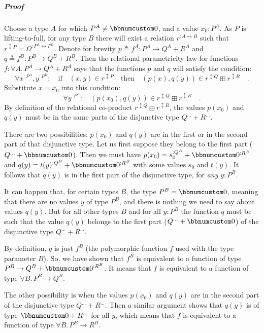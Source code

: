 \subparagraph{Proof}

Choose a type $A$ for which $P^{A}\neq\bbnum 0$, and a value $x_{0}:P^{A}$.
As $P$ is lifting-to-full, for any type $B$ there will exist a relation
$r^{:A\leftrightarrow B}$ such that $r^{\updownarrow P}=\Omega^{:P^{A}\leftrightarrow P^{B}}$.
Denote for brevity $p\triangleq f^{A}:P^{A}\rightarrow Q^{A}+R^{A}$
and $q\triangleq f^{B}:P^{B}\rightarrow Q^{B}+R^{B}$. Then the relational
parametricity law for functions $f:\forall A.\,P^{A}\rightarrow Q^{A}+R^{A}$
says that the functions $p$ and $q$ will satisfy the condition:
\[
\forall x^{:P^{A}},y^{:P^{B}}:\quad\text{if}\quad(x,y)\in r^{\updownarrow P}\quad\text{then}\quad(p(x),q(y))\in r^{\updownarrow Q}\boxplus r^{\updownarrow R}\quad.
\]
Substitute $x=x_{0}$ into this condition:
\[
\forall y^{:P^{B}}:\quad(p(x_{0}),q(y))\in r^{\updownarrow Q}\boxplus r^{\updownarrow R}\quad.
\]
By definition of the relational co-product $r^{\updownarrow Q}\boxplus r^{\updownarrow R}$,
the values $p(x_{0})$ and $q(y)$ must be in the same parts of the
disjunctive type $Q^{...}+R^{...}$. 

There are two possibilities: $p(x_{0})$ and $q(y)$ are in the first
or in the second part of that disjunctive type. Let us first suppose
they belong to the first part ($Q^{...}+\bbnum 0$). Then we must
have $p(x_{0})=s_{0}^{:Q^{A}}+\bbnum 0^{:R^{A}}$ and $q(y)=t(y)^{:Q^{B}}+\bbnum 0^{:R^{B}}$
with some values $s_{0}$ and $t(y)$. It follows that $q(y)$ is
in the first part of the disjunctive type, for \emph{any} $y:P^{B}$. 

It can happen that, for certain types $B$, the type $P^{B}=\bbnum 0$,
meaning that there are no values $y$ of type $P^{B}$, and there
is nothing we need to say about values $q(y)$. But for all other
types $B$ and for all $y:P^{B}$ the function $q$ must be such that
the value $q(y)$ belongs to the first part ($Q^{...}+\bbnum 0$)
of the disjunctive type $Q^{...}+R^{...}$.

By definition, $q$ is just $f^{B}$ (the polymorphic function $f$
used with the type parameter $B$). So, we have shown that $f^{B}$
is equivalent to a function of type $P^{B}\rightarrow Q^{B}+\bbnum 0^{:R^{B}}$.
It means that $f$ is equivalent to a function of type $\forall B.\,P^{B}\rightarrow Q^{B}$.

The other possibility is when the values $p(x_{0})$ and $q(y)$ are
in the second part of the disjunctive type $Q^{...}+R^{...}$. Then
a similar argument shows that $q(y)$ is of type $\bbnum 0+R^{...}$
for all $y$, which means that $f$ is equivalent to a function of
type $\forall B.\,P^{B}\rightarrow R^{B}$.

